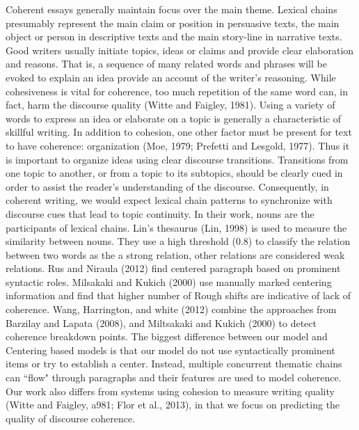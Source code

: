 Coherent essays generally maintain focus over the main theme. 
Lexical chains presumably represent the main claim or position in persuasive texts, the main object or person in descriptive texts and the main story-line in narrative texts. 
Good writers usually initiate topics, ideas or claims and provide clear elaboration and reasons. 
That is, a sequence of many related words and phrases will be evoked to explain an idea provide an account of the writer's reasoning. 
While cohesiveness is vital for coherence, too much repetition of the same word can, in fact, harm the discourse quality (Witte and Faigley, 1981). 
Using a variety of words to express an idea or elaborate on a topic is generally a characteristic of skillful writing. 
In addition to cohesion, one other factor must be present for text to have coherence: organization (Moe, 1979; Prefetti and Lesgold, 1977). 
Thus it is important to organize ideas using clear discourse transitions.
Transitions from one topic to another, or from a topic to its subtopics, should be clearly cued in order to assist the reader's understanding of the discourse.
Consequently, in coherent writing, we would expect lexical chain patterns to synchronize with discourse cues that lead to topic continuity.  
In their work, nouns are the participants of lexical chains. 
Lin's thesaurus (Lin, 1998) is used to measure the similarity between nouns. 
They use a high threshold ($0.8$) to classify the relation between two words as the a strong relation, other relations are considered weak relations. 
Rus and Niraula (2012) find centered paragraph based on prominent syntactic roles. 
Milsakaki and Kukich (2000) use manually marked centering information and find that higher number of Rough shifts are indicative of lack of coherence. 
Wang, Harrington, and white (2012) combine the approaches from Barzilay and Lapata (2008), and Miltsakaki and Kukich (2000) to detect coherence breakdown points. 
The biggest difference between our model and Centering based models is that our model do not use syntactically prominent items or try to establish a center. Instead, multiple concurrent thematic chains can ``flow" through paragraphs and their features are used to model coherence. 
Our work also differs from systems using cohesion to measure writing quality (Witte and Faigley, a981; Flor et al., 2013), in that we focus on predicting the quality of discourse coherence. 


